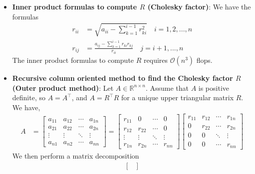 \documentclass{report}
\begin{document}
\begin{itemize}
        \item \textbf{Inner product formulas to compute $R$ (Cholesky factor)}: We have the formulas
            \begin{align*}
                r_{ii} &= \sqrt{a_{ii} - \sum_{k=1}^{i-1}r_{ki}^{2}} \quad i = 1,2,...,n \\
                r_{ij} &= \frac{a_{ij} - \sum_{k=1}^{i-1}r_{ki}r_{kj}}{r_{ii}} \quad j = i+1,...,n
            \end{align*}
            \bigbreak \noindent 
            The inner product formulas to compute $R$ requires $\mathcal{O}(n^{3})$ flops.
        \item \textbf{Recursive column oriented method to find the Cholesky factor $R$ (Outer product method)}: Let $A \in \mathbb{R}^{n\times n}$. Assume that $A$ is positive definite, so $A = A^{\top}$, and $A = R^{\top}R$ for a unique upper triangular matrix $R$. We have,
            \begin{align*}
                A &= \begin{bmatrix} a_{11} & a_{12} & \cdots & a_{1n} \\ a_{21} & a_{22} & \cdots & a_{2n} \\ \vdots & \vdots & \ddots & \vdots \\ a_{n1} & a_{n2} & \cdots & a_{nn} \end{bmatrix} = 
                \begin{bmatrix}
                    r_{11} & 0  & \cdots & 0\\
                    r_{12} & r_{22}  &  \cdots & 0 \\
                    \vdots & \vdots & \ddots & \vdots\\
                    r_{1n} & r_{2n} & \cdots & r_{nn}
                \end{bmatrix}
                \begin{bmatrix}
                    r_{11} & r_{12} & \cdots & r_{1n} \\
                    0 & r_{22} & \cdots & r_{2n} \\
                    0 & 0 & \ddots & \vdots \\
                    0 & 0  & \cdots & r_{nn}
                \end{bmatrix}
            \end{align*}
            We then perform a matrix decomposition 
            \begin{align*}
                \begin{bmatrix}

\end{bmatrix}
\end{align*}
\end{itemize}
\end{document}
